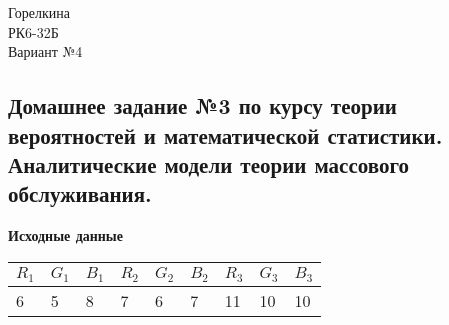 \documentclass{article}
\begin{document}
\begin{flushright}

\Large Горелкина \\ РК6-32Б \\ Вариант №4

\end{flushright}

\begin{center}

\section*{Домашнее задание №3 по курсу теории вероятностей и математической статистики. \\ Аналитические модели теории массового обслуживания.}


\vspace{\baselineskip}
\textbf{\large Исходные данные}
\vspace{\baselineskip}

\begin{tabular}[c]{p{0.5cm}|p{0.5cm}|p{0.5cm}|p{0.5cm}|p{0.5cm}|p{0.5cm}|p{0.5cm}|p{0.5cm}|p{0.5cm}}
\textbf{\begin{math}R_1\end{math}} & \textbf{\begin{math}G_1\end{math}} & \textbf{\begin{math}B_1\end{math}} & \textbf{\begin{math}R_2\end{math}} & \textbf{\begin{math}G_2\end{math}} & \textbf{\begin{math}B_2\end{math}} & \textbf{\begin{math}R_3\end{math}} & \textbf{\begin{math}G_3\end{math}} & \textbf{\begin{math}B_3\end{math}} 
\\[1mm] \hline
6 & 5 & 8 & 7 & 6 & 7 & 11 & 10 & 10  
\end{tabular}
\end{center}
\end{document}

